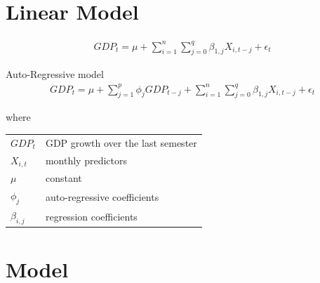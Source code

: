 \documentclass[12pt,a4paper,oneside]{book}
\begin{document}
\section{Linear Model}
\begin{eqnarray}
    GDP_{t} = \mu + \sum^n_{i = 1} \sum^q_{j = 0}
       \beta_{1,j} X_{i,t-j} + \epsilon_t 
\end{eqnarray}

Auto-Regressive model
\begin{eqnarray}
    GDP_{t} = \mu + \sum^p_{j = 1} \phi_j GDP_{t-j} +         \sum^n_{i = 1} \sum^q_{j = 0}
       \beta_{1,j} X_{i,t-j} + \epsilon_t 
\end{eqnarray}

where   \\
\begin{tabular}{l l}
    $GDP_t$     & GDP growth over the last semester \\
    $X_{i,t}$   & monthly predictors \\
    $\mu$       & constant \\
    $\phi_j$    & auto-regressive coefficients \\
    $\beta_{i,j}$ & regression coefficients \\
\end{tabular}



\section{Model}

\newpage
\end{document}
